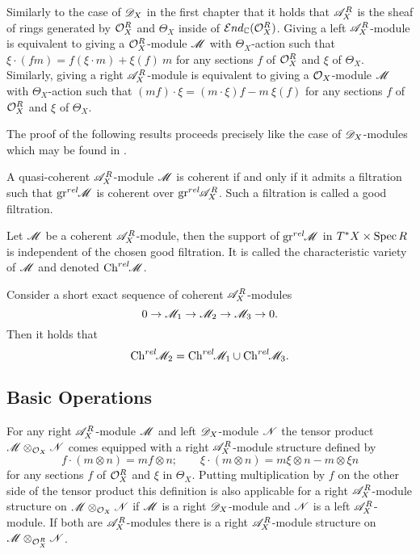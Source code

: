 Similarly to the case of $\mathscr{D}_X$ in the first chapter that  it holds that $\mathscr{A}_X^R$ is the sheaf of rings generated by $\mathcal{O}_X^R$ and $\Theta_X$ inside of $\mathcal{E}nd_{\mathbb{C}}(\mathcal{O}_X^R)$. Giving a left $\mathscr{A}_X^R$-module is equivalent to giving a $\mathcal{O}_X^R$-module $\mathscr{M}$ with $\Theta_X$-action such that
$\xi\cdot (fm) = f (\xi \cdot m)  + \xi(f)\ m  $
for any sections $f$ of $\mathcal{O}_X^R$ and $\xi$ of $\Theta_X$. Similarly, giving a right $\mathscr{A}_X^R$-module is equivalent to giving a $\mathcal{O}_X$-module $\mathscr{M}$ with $\Theta_X$-action such that $(mf)\cdot\xi = (m\cdot\xi)f - m\ \xi(f) $ for any sections $f$ of $\mathcal{O}_X^R$ and $\xi$ of $\Theta_X$.

The proof of the following results proceeds precisely like the case of $\mathscr{D}_X$-modules which may be found in \cite[Chapter 2]{hotta2007d}. 
\begin{proposition}\label{prop: CoherentAndGoodFiltration}
    A quasi-coherent $\mathscr{A}_X^R$-module $\mathscr{M}$ is coherent if and only if it admits a filtration such that $\operatorname{gr}^{rel}\mkern-5mu \mathscr{M}$ is coherent over $\operatorname{gr}^{rel}\mkern-5mu \mathscr{A}_X^R$. Such a filtration is called a good filtration.
\end{proposition}
\begin{proposition}
    Let $\mathscr{M}$ be a coherent $\mathscr{A}_X^R$-module, then the support of $\operatorname{gr}^{rel}\mkern-5mu \mathscr{M}$ in $T^*X \times \operatorname{Spec} R$ is independent of the chosen good filtration. It is called the characteristic variety of $\mathscr{M}$ and denoted $\operatorname{Ch}^{rel}\mkern-5mu \mathscr{M}$.
\end{proposition}
\begin{lemma}\label{lem: SESBehaviourA}
    Consider a short exact sequence of coherent $\mathscr{A}_X^R$-modules
    $$0\to \mathscr{M}_1 \to \mathscr{M}_2 \to\mathscr{M}_3 \to 0. $$
    Then it holds that
    $$\operatorname{Ch}^{rel}\mkern-5mu \mathscr{M}_2 = \operatorname{Ch}^{rel}\mkern-5mu \mathscr{M}_1 \cup \operatorname{Ch}^{rel}\mkern-5mu \mathscr{M}_3. $$
\end{lemma}
\subsection{Basic Operations}\label{sec: BasicOperations}
For any right $\mathscr{A}_{X}^R$-module $\mathscr{M}$ and left $\mathscr{D}_X$-module $\mathscr{N}$ the tensor product $\mathscr{M} \otimes_{\mathcal{O}_X} \mathscr{N}$ comes equipped with a right $\mathscr{A}_X^R$-module structure defined by
$$f\cdot (m\otimes n) = mf \otimes n; \qquad \xi \cdot (m\otimes n) = m\xi \otimes n - m\otimes \xi n $$
for any sections $f$ of $\mathcal{O}_X^R$ and $\xi$ in $\Theta_X$. Putting multiplication by $f$ on the other side of the tensor product this definition is also applicable for a right $\mathscr{A}_X^R$-module structure on $\mathscr{M}\otimes_{\mathcal{O}_X} \mathscr{N}$ if $\mathscr{M}$ is a right $\mathscr{D}_X$-module and $\mathscr{N}$ is a left $\mathscr{A}_X^R$-module. If both are $\mathscr{A}_X^R$-modules there is a right $\mathscr{A}_X^R$-module structure on $\mathscr{M}\otimes_{\mathcal{O}_X^R} \mathscr{N}$.

